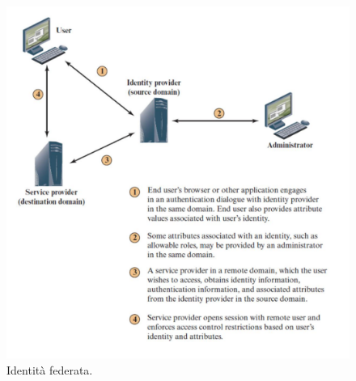 \begin{figure}
    \centering
    \includegraphics[width=1\textwidth]{images/chapter4/4-2.png}
    \caption{Identità federata.}
    \label{fig:4-2}
\end{figure}